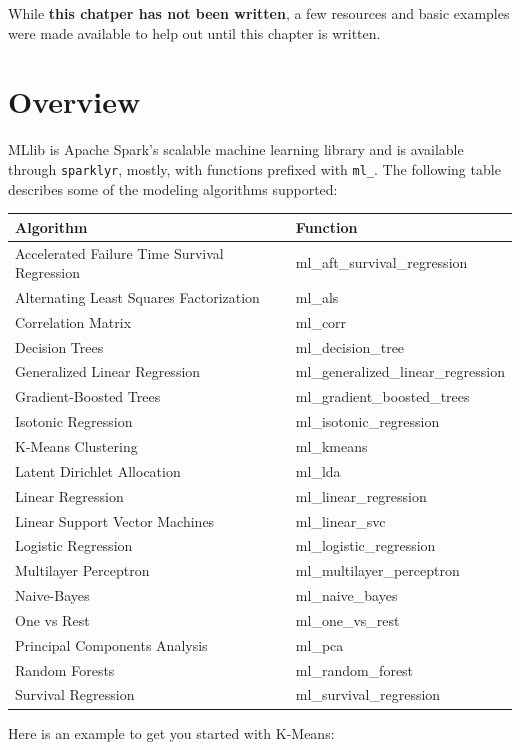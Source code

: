 \documentclass[]{book}
\newenvironment{Shaded}{\begin{snugshade}}{\end{snugshade}}
\newcommand{\CommentTok}[1]{\textcolor[rgb]{0.56,0.35,0.01}{\textit{#1}}}
\newcommand{\DataTypeTok}[1]{\textcolor[rgb]{0.13,0.29,0.53}{#1}}
\newcommand{\DecValTok}[1]{\textcolor[rgb]{0.00,0.00,0.81}{#1}}
\newcommand{\KeywordTok}[1]{\textcolor[rgb]{0.13,0.29,0.53}{\textbf{#1}}}
\newcommand{\NormalTok}[1]{#1}
\newcommand{\OperatorTok}[1]{\textcolor[rgb]{0.81,0.36,0.00}{\textbf{#1}}}
\newcommand{\OtherTok}[1]{\textcolor[rgb]{0.56,0.35,0.01}{#1}}
\newcommand{\StringTok}[1]{\textcolor[rgb]{0.31,0.60,0.02}{#1}}
\theoremstyle{definition}
\theoremstyle{definition}
\theoremstyle{definition}
\theoremstyle{remark}
\begin{document}
While \textbf{this chatper has not been written}, a few resources and
basic examples were made available to help out until this chapter is
written.

\hypertarget{overview}{%
\section{Overview}\label{overview}}

MLlib is Apache Spark's scalable machine learning library and is
available through \texttt{sparklyr}, mostly, with functions prefixed
with \texttt{ml\_}. The following table describes some of the modeling
algorithms supported:

\begin{longtable}[]{@{}ll@{}}
\toprule
Algorithm & Function\tabularnewline
\midrule
\endhead
Accelerated Failure Time Survival Regression &
ml\_aft\_survival\_regression\tabularnewline
Alternating Least Squares Factorization & ml\_als\tabularnewline
Correlation Matrix & ml\_corr\tabularnewline
Decision Trees & ml\_decision\_tree\tabularnewline
Generalized Linear Regression &
ml\_generalized\_linear\_regression\tabularnewline
Gradient-Boosted Trees & ml\_gradient\_boosted\_trees\tabularnewline
Isotonic Regression & ml\_isotonic\_regression\tabularnewline
K-Means Clustering & ml\_kmeans\tabularnewline
Latent Dirichlet Allocation & ml\_lda\tabularnewline
Linear Regression & ml\_linear\_regression\tabularnewline
Linear Support Vector Machines & ml\_linear\_svc\tabularnewline
Logistic Regression & ml\_logistic\_regression\tabularnewline
Multilayer Perceptron & ml\_multilayer\_perceptron\tabularnewline
Naive-Bayes & ml\_naive\_bayes\tabularnewline
One vs Rest & ml\_one\_vs\_rest\tabularnewline
Principal Components Analysis & ml\_pca\tabularnewline
Random Forests & ml\_random\_forest\tabularnewline
Survival Regression & ml\_survival\_regression\tabularnewline
\bottomrule
\end{longtable}

Here is an example to get you started with K-Means:

\begin{Shaded}
\end{Shaded}
\end{document}

